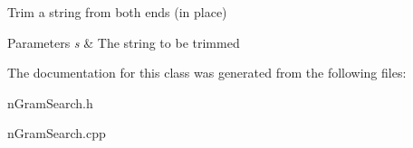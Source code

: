 Trim a string from both ends (in place) 
\begin{DoxyParams}{Parameters}
{\em s} & The string to be trimmed \\
\hline
\end{DoxyParams}


The documentation for this class was generated from the following files\+:\begin{DoxyCompactItemize}
\item 
n\+Gram\+Search.\+h\item 
n\+Gram\+Search.\+cpp\end{DoxyCompactItemize}
